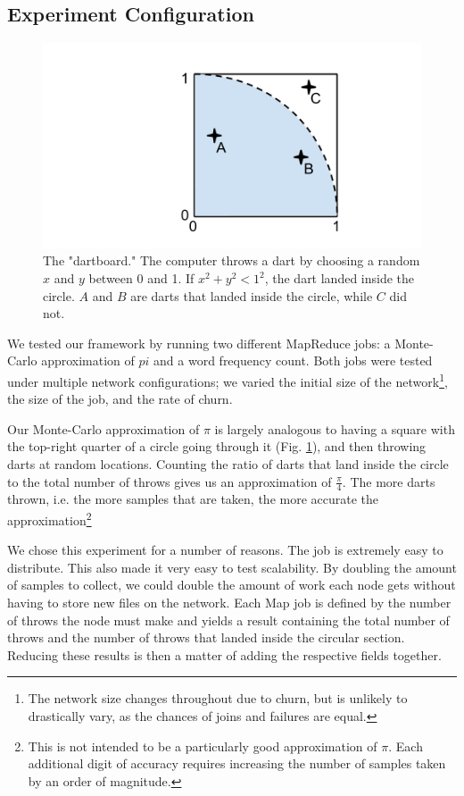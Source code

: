 \subsection{Experiment Configuration}

\begin{figure}
    \includegraphics[width=\linewidth]{dartboard}
    \caption{The "dartboard." The computer throws a dart by choosing a random $x$ and $y$ between 0 and 1.  If $x^{2} + y^{2} < 1^{2} $, the dart landed inside the circle.  $A$ and $B$ are darts that landed inside the circle, while $C$ did not.}
    \label{dartboard}
\end{figure}



We tested our framework by running two different MapReduce jobs: a Monte-Carlo approximation of $pi$ and a word frequency count.  
Both jobs were tested under multiple network configurations; we varied the initial size of the network\footnote{The network size changes throughout due to churn, but is unlikely to drastically vary, as the chances of joins and failures are equal.}, the size of the job, and the rate of churn.

Our Monte-Carlo approximation of $\pi$ is largely analogous to having a square with the top-right quarter of a circle going through it (Fig. \ref{dartboard}), and then throwing darts at random locations.  Counting the ratio of darts that land inside the circle to the total number of throws gives us an approximation of $\frac{\pi}{4}$.  The more darts thrown, i.e. the more samples that are taken, the more accurate the approximation\footnote{This is not intended to be a particularly good approximation of $\pi$. Each additional digit of accuracy requires increasing the number of samples taken by an order of magnitude.}

We chose this experiment for a number of reasons. The job is extremely easy to distribute.  This also made it very easy to test scalability. By doubling the amount of samples to collect, we could double the amount of work each node gets without having to store new files on the network.  
Each Map job is defined by the number of throws the node must make and yields a result containing the total number of throws and the number of throws that landed inside the circular section.  Reducing these results is then a matter of adding the respective fields together. 


